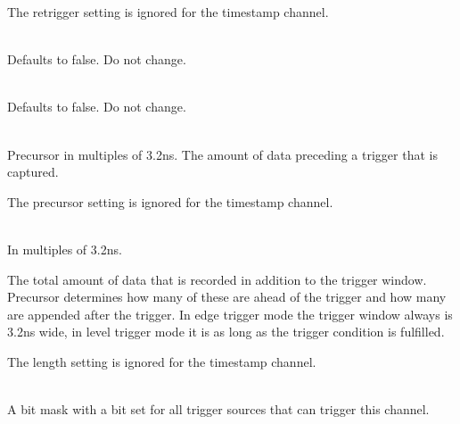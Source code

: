 		The retrigger setting is ignored for the timestamp channel.\par

		\\
		Defaults to false. Do not change.\par

		\\
		Defaults to false. Do not change.\par

		\\
		Precursor in multiples of 3.2ns. The amount of data preceding a trigger that is captured.\par
		
		The precursor setting is ignored for the timestamp channel.\par

		\\
		In multiples of 3.2ns.\par

		The total amount of data that is recorded in addition to the trigger window. Precursor determines how many of these are ahead of the trigger and how many are appended after the trigger. In edge trigger mode the trigger window always is 3.2ns wide, in level trigger mode it is as long as the
trigger condition is fulfilled.\par

		The length setting is ignored for the timestamp channel.\par

		\\
		A bit mask with a bit set for all trigger sources that can trigger this channel.\par
		
